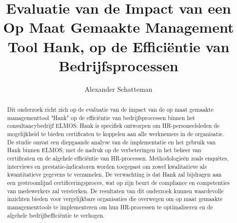 \documentclass{hogent-article}
\title{Evaluatie van de Impact van een Op Maat Gemaakte Management Tool Hank, op de Efficiëntie van Bedrijfsprocessen}
\author{Alexander Schatteman}
\begin{document}
\begin{abstract}
Dit onderzoek richt zich op de evaluatie van de impact van de op maat gemaakte managementtool "Hank" op de efficiëntie van bedrijfsprocessen binnen het consultancybedrijf ELMOS. Hank is specifiek ontworpen om HR-personeelsleden de mogelijkheid te bieden certificaten te koppelen aan alle werknemers in de organisatie.
De studie omvat een diepgaande analyse van de implementatie en het gebruik van Hank binnen ELMOS, met de nadruk op de verbeteringen in het beheer van certificaten en de algehele efficiëntie van HR-processen. Methodologieën zoals enquêtes, interviews en prestatie-indicatoren worden toegepast om zowel kwalitatieve als kwantitatieve gegevens te verzamelen.
De verwachting is dat Hank zal bijdragen aan een gestroomlijnd certificeringsproces, wat op zijn beurt de compliance en competenties van medewerkers zal versterken. De resultaten van dit onderzoek kunnen waardevolle inzichten bieden voor vergelijkbare organisaties die overwegen om op maat gemaakte managementtools te implementeren om hun HR-processen te optimaliseren en de algehele bedrijfsefficiëntie te verhogen.
\end{abstract}

\tableofcontents



\printbibliography[heading=bibintoc]
\end{document}
